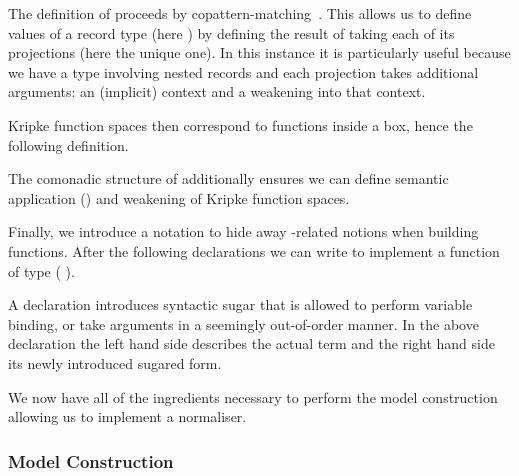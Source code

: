 
\begin{remark}
The definition of  proceeds by
copattern-matching~\cite{DBLP:conf/popl/AbelPTS13}.
This allows us to define values of a record type
(here ) by defining the result of taking
each of its projections (here the unique  one).
In this instance it is particularly useful because we have
a type involving nested records and each projection takes
additional arguments: an (implicit) context and a weakening
into that context.
\end{remark}

Kripke function spaces then correspond to functions inside a box,
hence the following definition.


The comonadic structure of  additionally ensures we can define
semantic application (\AF{\_\$\$\_}) and weakening of Kripke function
spaces.


Finally, we introduce a notation to hide away -related
notions when building  functions.
%
After the following declarations we can write
\AIC{λλ[}  \AIC{,}  \AIC{]}  to implement a function of type
(   ).


\begin{remark}
  A  declaration introduces syntactic sugar that is
  allowed to perform variable binding, or take arguments in a
  seemingly out-of-order manner.
  In the above declaration the left hand side describes the
  actual term and the right hand side its newly introduced
  sugared form.
\end{remark}

We now have all of the ingredients necessary to perform the model
construction allowing us to implement a normaliser.

\subsubsection{Model Construction}

